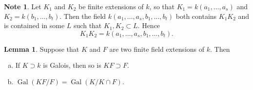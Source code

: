\documentclass[10pt,letterpaper,cm]{nupset}
\theoremstyle{definition}
\newtheorem{note}{Note}
\newtheorem{lemma}{Lemma}
\newcommand{\1}{\mathbf{1}}
\newcommand{\0}{\vec 0}
\DeclareMathOperator{\gal}{Gal}
\begin{document}
\begin{note}
Let $K_1$ and $K_2$ be finite extensions of $k$, so that $K_1 = k(a_1, \ldots, a_s)$ and $K_2= k(b_1, \ldots, b_t)$. Then the field $k(a_1, \ldots, a_s, b_1, \ldots, b_t)$ both contains  $K_1K_2$ and is contained in some $L$ such that $K_1, K_2 \subset L$. Hence $$K_1K_2 =  k(a_1, \ldots, a_s, b_1, \ldots, b_t).$$ 
\end{note}

\begin{lemma}
Suppose that $K$ and $F$ are two finite field extensions of $k$. Then
\begin{enumerate}[(a)]
\item If $K\supset k$ is Galois, then so is $KF\supset F$.
\item $\gal(KF/F) = \gal(K/ K \cap F)$.
\end{enumerate}
\end{lemma}
\end{document}
